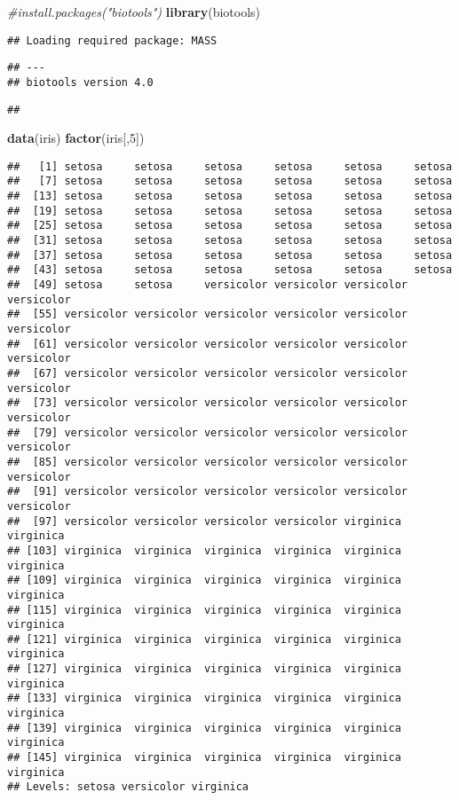 \documentclass[]{article}
\newenvironment{Shaded}{\begin{snugshade}}{\end{snugshade}}
\newcommand{\KeywordTok}[1]{\textcolor[rgb]{0.13,0.29,0.53}{\textbf{#1}}}
\newcommand{\DecValTok}[1]{\textcolor[rgb]{0.00,0.00,0.81}{#1}}
\newcommand{\CommentTok}[1]{\textcolor[rgb]{0.56,0.35,0.01}{\textit{#1}}}
\newcommand{\NormalTok}[1]{#1}
\begin{document}
\begin{Shaded}
\begin{Highlighting}[]
\CommentTok{#install.packages("biotools")}
\KeywordTok{library}\NormalTok{(biotools)}
\end{Highlighting}
\end{Shaded}

\begin{verbatim}
## Loading required package: MASS
\end{verbatim}

\begin{verbatim}
## ---
## biotools version 4.0
\end{verbatim}

\begin{verbatim}
## 
\end{verbatim}

\begin{Shaded}
\begin{Highlighting}[]
\KeywordTok{data}\NormalTok{(iris)}
\KeywordTok{factor}\NormalTok{(iris[,}\DecValTok{5}\NormalTok{])}
\end{Highlighting}
\end{Shaded}

\begin{verbatim}
##   [1] setosa     setosa     setosa     setosa     setosa     setosa    
##   [7] setosa     setosa     setosa     setosa     setosa     setosa    
##  [13] setosa     setosa     setosa     setosa     setosa     setosa    
##  [19] setosa     setosa     setosa     setosa     setosa     setosa    
##  [25] setosa     setosa     setosa     setosa     setosa     setosa    
##  [31] setosa     setosa     setosa     setosa     setosa     setosa    
##  [37] setosa     setosa     setosa     setosa     setosa     setosa    
##  [43] setosa     setosa     setosa     setosa     setosa     setosa    
##  [49] setosa     setosa     versicolor versicolor versicolor versicolor
##  [55] versicolor versicolor versicolor versicolor versicolor versicolor
##  [61] versicolor versicolor versicolor versicolor versicolor versicolor
##  [67] versicolor versicolor versicolor versicolor versicolor versicolor
##  [73] versicolor versicolor versicolor versicolor versicolor versicolor
##  [79] versicolor versicolor versicolor versicolor versicolor versicolor
##  [85] versicolor versicolor versicolor versicolor versicolor versicolor
##  [91] versicolor versicolor versicolor versicolor versicolor versicolor
##  [97] versicolor versicolor versicolor versicolor virginica  virginica 
## [103] virginica  virginica  virginica  virginica  virginica  virginica 
## [109] virginica  virginica  virginica  virginica  virginica  virginica 
## [115] virginica  virginica  virginica  virginica  virginica  virginica 
## [121] virginica  virginica  virginica  virginica  virginica  virginica 
## [127] virginica  virginica  virginica  virginica  virginica  virginica 
## [133] virginica  virginica  virginica  virginica  virginica  virginica 
## [139] virginica  virginica  virginica  virginica  virginica  virginica 
## [145] virginica  virginica  virginica  virginica  virginica  virginica 
## Levels: setosa versicolor virginica
\end{verbatim}
\end{document}
